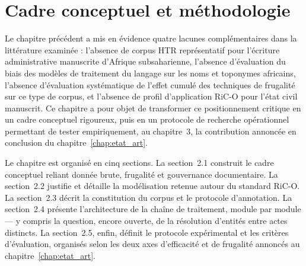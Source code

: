 \chapter{Cadre conceptuel et méthodologie}
\label{chap:methodologie}

Le chapitre précédent a mis en évidence quatre lacunes complémentaires dans la littérature examinée : l'absence de corpus HTR représentatif pour l'écriture administrative manuscrite d'Afrique subsaharienne, l'absence d'évaluation du biais des modèles de traitement du langage sur les noms et toponymes africains, l'absence d'évaluation systématique de l'effet cumulé des techniques de frugalité sur ce type de corpus, et l'absence de profil d'application RiC-O pour l'état civil manuscrit.
Ce chapitre a pour objet de transformer ce positionnement critique en un cadre conceptuel rigoureux, puis en un protocole de recherche opérationnel permettant de tester empiriquement, au chapitre~3, la contribution annoncée en conclusion du chapitre~\ref{chap:etat_art}.



Le chapitre est organisé en cinq sections.
La section~2.1 construit le cadre conceptuel reliant donnée brute, frugalité et gouvernance documentaire.
La section~2.2 justifie et détaille la modélisation retenue autour du standard RiC-O. La section~2.3 décrit la constitution du corpus et le protocole d'annotation.
La section~2.4 présente l'architecture de la chaîne de traitement, module par module --- y compris la question, encore ouverte, de la résolution d'entités entre actes distincts.
La section~2.5, enfin, définit le protocole expérimental et les critères d'évaluation, organisés selon les deux axes d'efficacité et de frugalité annoncés au chapitre~\ref{chap:etat_art}.

